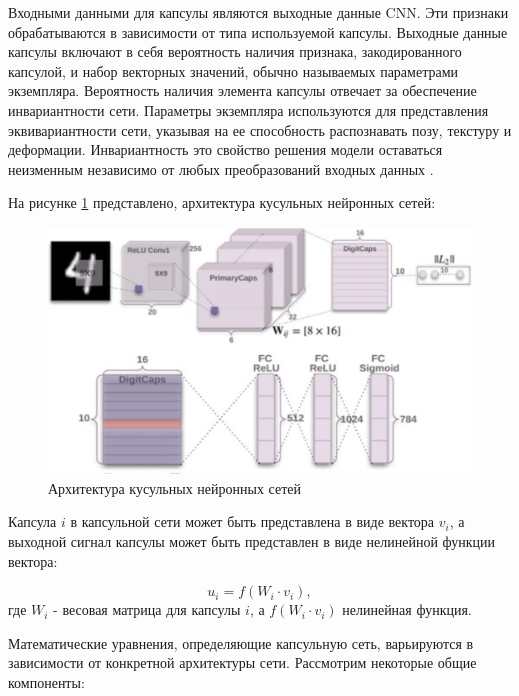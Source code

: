 Входными данными для капсулы являются выходные данные CNN. Эти признаки обрабатываются в зависимости от типа используемой капсулы. Выходные данные капсулы включают в себя вероятность наличия признака, закодированного капсулой, и набор векторных значений, обычно называемых параметрами экземпляра. Вероятность наличия элемента капсулы отвечает за обеспечение инвариантности сети. Параметры экземпляра используются для представления эквивариантности сети, указывая на ее способность распознавать позу, текстуру и деформации. Инвариантность это свойство решения модели оставаться неизменным независимо от любых преобразований входных данных \cite{patrick2022capsule}.

На рисунке \ref{fig:residual-block} представлено, архитектура кусульных нейронных сетей:
\begin{figure}[H]
	\centering
	\includegraphics[width=0.6\linewidth]{assets/capsnet.png}
	\caption{Архитектура кусульных нейронных сетей}
	\label{fig:residual-block}
\end{figure}

Капсула \(i\) в капсульной сети может быть представлена в виде вектора \(v_{i}\), а выходной сигнал капсулы может быть представлен в виде нелинейной функции вектора:

\begin{equation}
    u_{i} = f(W_{i} \cdot v_{i}),
\end{equation}
где \(W_{i}\) - весовая матрица для капсулы \(i\), а \(f(W_{i} \cdot v_{i})\) нелинейная функция.

Математические уравнения, определяющие капсульную сеть, варьируются в зависимости от конкретной архитектуры сети. Рассмотрим некоторые общие компоненты:

